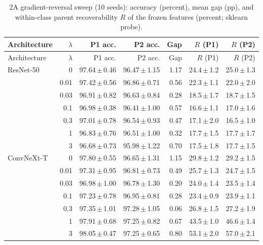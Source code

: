 {\footnotesize
\setlength{\tabcolsep}{3.5pt}
\begin{longtable}{lrrrrrr}
\caption{2A gradient-reversal sweep (10 seeds): accuracy (percent), mean gap (pp), and within-class parent recoverability $R$ of the frozen features (percent; sklearn probe).}\label{r:tab:grl}\\
\toprule
Architecture & $\lambda$ & P1 acc. & P2 acc. & Gap & $R$ (P1) & $R$ (P2) \\
\midrule
\endfirsthead
\toprule
Architecture & $\lambda$ & P1 acc. & P2 acc. & Gap & $R$ (P1) & $R$ (P2) \\
\midrule
\endhead
\bottomrule
\endfoot
ResNet-50 & 0 & 97.64\,$\pm$\,0.46 & 96.47\,$\pm$\,1.15 & 1.17 & 24.4\,$\pm$\,1.2 & 25.0\,$\pm$\,1.3 \\
 & 0.01 & 97.42\,$\pm$\,0.56 & 96.86\,$\pm$\,0.71 & 0.56 & 22.3\,$\pm$\,1.1 & 22.0\,$\pm$\,2.0 \\
 & 0.03 & 96.91\,$\pm$\,0.82 & 96.63\,$\pm$\,0.84 & 0.28 & 18.5\,$\pm$\,1.7 & 18.7\,$\pm$\,1.5 \\
 & 0.1 & 96.98\,$\pm$\,0.38 & 96.41\,$\pm$\,1.00 & 0.57 & 16.6\,$\pm$\,1.1 & 17.0\,$\pm$\,1.6 \\
 & 0.3 & 97.01\,$\pm$\,0.78 & 96.54\,$\pm$\,0.93 & 0.47 & 17.1\,$\pm$\,2.0 & 16.5\,$\pm$\,1.0 \\
 & 1 & 96.83\,$\pm$\,0.76 & 96.51\,$\pm$\,1.00 & 0.32 & 17.7\,$\pm$\,1.5 & 17.7\,$\pm$\,1.7 \\
 & 3 & 96.68\,$\pm$\,0.73 & 95.98\,$\pm$\,1.22 & 0.70 & 17.5\,$\pm$\,1.8 & 17.7\,$\pm$\,1.5 \\
ConvNeXt-T & 0 & 97.80\,$\pm$\,0.55 & 96.65\,$\pm$\,1.31 & 1.15 & 29.8\,$\pm$\,1.2 & 29.2\,$\pm$\,1.5 \\
 & 0.01 & 97.31\,$\pm$\,0.95 & 96.81\,$\pm$\,0.73 & 0.49 & 25.7\,$\pm$\,1.3 & 24.7\,$\pm$\,1.5 \\
 & 0.03 & 96.98\,$\pm$\,1.00 & 96.78\,$\pm$\,1.30 & 0.20 & 24.0\,$\pm$\,1.4 & 23.5\,$\pm$\,1.4 \\
 & 0.1 & 97.23\,$\pm$\,0.78 & 96.95\,$\pm$\,0.81 & 0.28 & 23.4\,$\pm$\,0.9 & 23.9\,$\pm$\,1.1 \\
 & 0.3 & 97.35\,$\pm$\,1.01 & 97.28\,$\pm$\,1.05 & 0.06 & 26.8\,$\pm$\,1.5 & 27.2\,$\pm$\,1.9 \\
 & 1 & 97.91\,$\pm$\,0.68 & 97.25\,$\pm$\,0.82 & 0.67 & 43.5\,$\pm$\,1.0 & 46.6\,$\pm$\,1.4 \\
 & 3 & 98.05\,$\pm$\,0.47 & 97.25\,$\pm$\,0.65 & 0.80 & 53.1\,$\pm$\,2.0 & 57.0\,$\pm$\,2.1 \\
\end{longtable}
}
